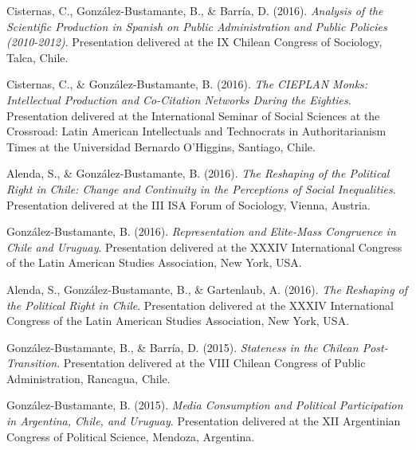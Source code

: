\begin{publications}
\begin{benumerate}{66}
\item{\small Cisternas, C., González-Bustamante, B., \& Barría, D. (2016). {\itshape Analysis of the Scientific Production in Spanish on Public Administration and Public Policies (2010-2012)}. Presentation delivered at the IX Chilean Congress of Sociology, Talca, Chile.}\vspace{1mm}

\item{\small Cisternas, C., \& González-Bustamante, B. (2016). {\itshape The CIEPLAN Monks: Intellectual Production and Co-Citation Networks During the Eighties}. Presentation delivered at the International Seminar of Social Sciences at the Crossroad: Latin American Intellectuals and Technocrats in Authoritarianism Times at the Universidad Bernardo O'Higgins, Santiago, Chile.}\vspace{1mm}

\item{\small Alenda, S., \& González-Bustamante, B. (2016). {\itshape The Reshaping of the Political Right in Chile: Change and Continuity in the Perceptions of Social Inequalities}. Presentation delivered at the III ISA Forum of Sociology, Vienna, Austria.}\vspace{1mm}

\item{\small González-Bustamante, B. (2016). {\itshape Representation and Elite-Mass Congruence in Chile and Uruguay}. Presentation delivered at the XXXIV International Congress of the Latin American Studies Association, New York, USA.}\vspace{1mm}

\item{\small Alenda, S., González-Bustamante, B., \& Gartenlaub, A. (2016). {\itshape The Reshaping of the Political Right in Chile}. Presentation delivered at the XXXIV International Congress of the Latin American Studies Association, New York, USA.}\vspace{1mm}

\item{\small González-Bustamante, B., \& Barría, D. (2015). {\itshape Stateness in the Chilean Post-Transition}. Presentation delivered at the VIII Chilean Congress of Public Administration, Rancagua, Chile.}\vspace{1mm}

\item{\small González-Bustamante, B. (2015). {\itshape Media Consumption and Political Participation in Argentina, Chile, and Uruguay}. Presentation delivered at the XII Argentinian Congress of Political Science, Mendoza, Argentina.}\vspace{1mm}


\end{benumerate}
\end{publications}

